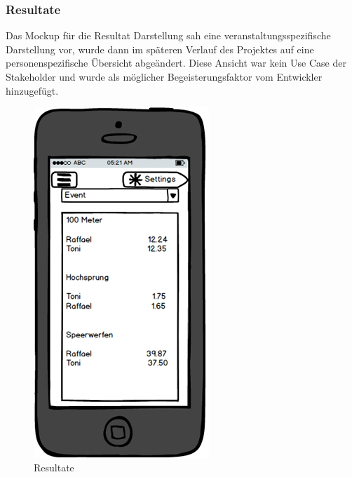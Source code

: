 \FloatBarrier
\subsubsection{Resultate}\label{mockup_results}
Das Mockup für die Resultat Darstellung sah eine veranstaltungsspezifische Darstellung vor, wurde dann im späteren Verlauf des Projektes auf eine personenspezifische Übersicht abgeändert. Diese Ansicht war kein Use Case der Stakeholder und wurde als möglicher Begeisterungsfaktor vom Entwickler hinzugefügt.
\begin{figure}[h]
\centering
\includegraphics[scale=0.5]{images/mockups/results.png}
\caption{Resultate}
\label{fig:mockup_results}
\end{figure}

\newpage
\FloatBarrier
